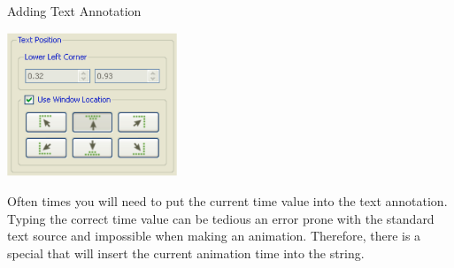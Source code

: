 \begin{exercise}{Adding Text Annotation}
  \begin{inlinefig}
    \includegraphics[width=2in]{images/TextPosition}
  \end{inlinefig}
\end{exercise}

Often times you will need to put the current time value into the text
annotation.  Typing the correct time value can be tedious an error prone
with the standard text source and impossible when making an animation.
Therefore, there is a special  that will
insert the current animation time into the string.

